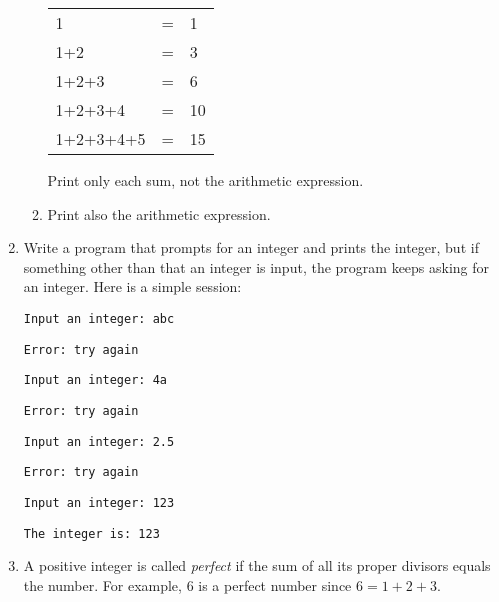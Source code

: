 \documentclass[14pt]{extarticle}
\begin{document}
\begin{enumerate}
\begin{enumerate}
		\begin{tabular}{|l|c|l|}
		1 & = & 1 \\
		1+2 & = & 3 \\
		1+2+3 & = & 6 \\
		1+2+3+4 & = & 10 \\
		1+2+3+4+5 & = & 15
		\end{tabular}
		Print only each sum, not the arithmetic expression.
		\item Print also the arithmetic expression.
	\end{enumerate}
	\item Write a program that prompts for an integer and prints the integer, but if something other than that an integer is input, the program keeps asking for an integer. Here is a simple session:
	
	\texttt{Input an integer: abc}
	
	\texttt{Error: try again}
	
	\texttt{Input an integer: 4a}
	
	\texttt{Error: try again}
	
	\texttt{Input an integer: 2.5}
	
	\texttt{Error: try again}
	
	\texttt{Input an integer: 123}
	
	\texttt{The integer is: 123}
	\item A positive integer is called \emph{perfect} if the sum of all its proper divisors equals the number. For example, 6 is a perfect number since $6=1+2+3$.
	

\end{enumerate}
\end{document}
